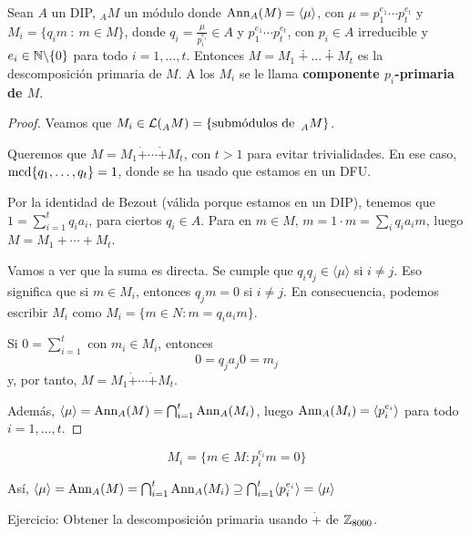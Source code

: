 \begin{prop}
  Sean \(A\) un DIP, \({}_AM\) un módulo donde \(\operatorname{Ann}_A(M) = \langle\mu\rangle\), con
  \(\mu = p_1^{e_1}\cdots p_t^{e_t}\) y \(M_i = \{q_im \ : \ m \in M\}\), donde
  \(q_i = \frac{\mu}{p_i^{e_i}} \in A\) y \(p_1^{e_1}\cdots p_t^{e_t}\), con \(p_i\in A\)
  irreducible y \(e_i \in \mathbb{N}\backslash\{0\}\) para todo \(i = 1, \ldots, t\).
  Entonces
  \(M = M_1 \dotplus \ldots \dotplus M_t\) es la descomposición primaria de \(M\). A los
  \(M_i\) se le llama \textbf{componente \(p_i\)-primaria de \(M\)}.
\end{prop}
\begin{proof}
  Veamos que \(M_i\in\mathcal{L}(\prescript{}{A}{M})=\{\textrm{submódulos
    de } \prescript{}{A}{M}\}\).

  Queremos que \(M=M_1\dot{+}\cdots \dot{+}M_t\), con \(t>1\) para
  evitar trivialidades. En ese caso, \(\operatorname{mcd}\{q_1,\ldots,q_t\}=1\),
  donde se ha usado que estamos en un DFU.

  Por la identidad de Bezout (válida porque estamos en un DIP),
  tenemos que \(1=\sum_{i=1}^t q_i a_i\), para ciertos \(q_i\in A\).
  Para en \(m\in M\), \(m = 1 \cdot m = \sum_i q_i a_i m\), luego
  \(M=M_1+\cdots+ M_t\).

  Vamos a ver que la suma es directa.
  Se cumple que \(q_i q_j\in\langle\mu\rangle\) si \(i\neq j\). Eso significa que si
  \(m\in M_i\), entonces \(q_j m= 0\) si \(i\neq j\).
  En consecuencia, podemos escribir \(M_i\) como \(M_i=\{m\in N: m=q_i a_i m\}\).

  Si \(0=\sum_{i=1}^t\) con \(m_i\in M_i\), entonces
  \[
    0=q_j a_j 0=m_j
  \]
  y, por tanto, \(M=M_1\dot{+}\cdots\dot{+} M_t\).

  Además, \(\langle \mu \rangle = \operatorname{Ann}_A(M) = \bigcap_{i=1}^{t}\operatorname{Ann}_A(M_i)\),
  luego \(\operatorname{Ann}_A(M_i) = \langle p_i^{e_i} \rangle\) para todo \(i=1, \ldots, t\).
\end{proof}

\begin{prop}
  \[
    M_i=\{m\in M: p_i^{e_i} m=0\}
  \]

  Así, \(\langle\mu\rangle=\operatorname{Ann}_A(M)=\bigcap_{i=1}^t\operatorname{Ann}_A(M_i)
  \supseteq\bigcap_{i=1}^t\langle p_i^{e_i}\rangle=\langle\mu\rangle\)
\end{prop}

Ejercicio: Obtener la descomposición primaria usando \(\dot{+}\) de
\(\mathbb{Z}_{8000}\).
